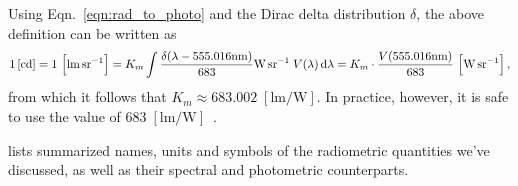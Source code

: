 \ifomit


Using Eqn.~\eqref{eqn:rad_to_photo} and the Dirac delta distribution $\delta$, the
above definition can be written as
\begin{equation}
    1\,[\unit{\candela}] = 1\,\left[\unit{\lumen\per\steradian}\right]
    = K_m \int \frac{\delta(\lambda-555.016\unit{\nano\meter})}{683} \unit{\watt\per\steradian}\;V(\lambda) \d\lambda
    = K_m \cdot \frac{V(555.016\unit{\nano\meter})}{683}\,\left[\unit{\watt\per\steradian}\right],
\end{equation}
from which it follows that $K_{m} \approx 683.002 \;[\unit{\lumen\per\watt}]$. 
In practice, however, it is safe to use the value of 
$683\;[\unit{\lumen\per\watt}]$~\cite{cie:018.2019,wyszecki82}.
\fi


 lists summarized names, units and symbols of the radiometric quantities we've discussed,
as well as their spectral and photometric counterparts.

